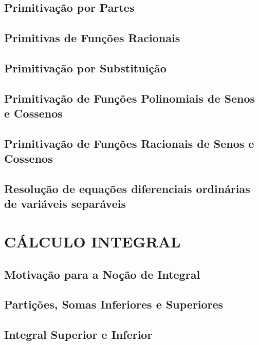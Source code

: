 \documentclass[11pt]{article}
\begin{document}
\subsection{Primitivação por Partes}

\subsection{Primitivas de Funções Racionais}

\subsection{Primitivação por Substituição}

\subsection{Primitivação de Funções Polinomiais de Senos e Cossenos}

\subsection{Primitivação de Funções Racionais de Senos e Cossenos}

\subsection{Resolução de equações diferenciais ordinárias de variáveis separáveis}



\newpage

\section{\MakeUppercase{Cálculo Integral}}

\subsection{Motivação para a Noção de Integral}

\subsection{Partições, Somas Inferiores e Superiores}

\subsection{Integral Superior e Inferior}
\end{document}
